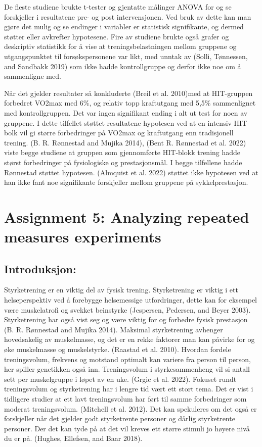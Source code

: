 \documentclass[
  letterpaper,
  DIV=11,
  numbers=noendperiod]{scrreprt}
\begin{document}
De fleste studiene brukte t-tester og gjentatte målinger ANOVA for og se
forskjeller i resultatene pre- og post intervensjonen. Ved bruk av dette
kan man gjøre det mulig og se endinger i variabler er statistisk
signifikante, og dermed støtter eller avkrefter hypotesene. Fire av
studiene brukte også grafer og deskriptiv statistikk for å vise at
treningsbelastningen mellom gruppene og utgangspunktet til
forsøkspersonene var likt, med unntak av (Solli, Tønnessen, and Sandbakk
2019) som ikke hadde kontrollgruppe og derfor ikke noe om å sammenligne
med.

Når det gjelder resultater så konkluderte (Breil et al. 2010)med at
HIT-gruppen forbedret VO2max med 6\%, og relativ topp kraftutgang med
5,5\% sammenlignet med kontrollgruppen. Det var ingen signifikant ending
i alt ut test for noen av gruppene. I dette tilfellet støttet
resultatene hypotesen ved at en intensiv HIT-bolk vil gi større
forbedringer på VO2max og kraftutgang enn tradisjonell trening. (B. R.
Rønnestad and Mujika 2014), (Bent R. Rønnestad et al. 2022) viste begge
studiene at gruppen som gjennomførte HIT-blokk trening hadde størst
forbedringer på fysiologiske og prestasjonsmål. I begge tilfellene hadde
Rønnestad støttet hypotesen. (Almquist et al. 2022) støttet ikke
hypotesen ved at han ikke fant noe signifikante forskjeller mellom
gruppene på sykkelprestasjon.


\chapter{Assignment 5: Analyzing repeated measures
experiments}\label{assignment-5-analyzing-repeated-measures-experiments}

\section{Introduksjon:}\label{introduksjon-2}

Styrketrening er en viktig del av fysisk trening. Styrketrening er
viktig i ett helseperspektiv ved å forebygge helsemessige utfordringer,
dette kan for eksempel være muskelatrofi og svekket beinstyrke
(Jespersen, Pedersen, and Beyer 2003). Styrketrening har også vist seg
og være viktig for og forbedre fysisk prestasjon (B. R. Rønnestad and
Mujika 2014). Maksimal styrketrening avhenger hovedsakelig av
muskelmasse, og det er en rekke faktorer man kan påvirke for og øke
muskelmasse og muskelstyrke. (Raastad et al. 2010). Hvordan fordele
treningsvolum, frekvens og motstand optimalt kan variere fra person til
person, her spiller genetikken også inn. Treningsvolum i
styrkesammenheng vil si antall sett per muskelgruppe i løpet av en uke.
(Grgic et al. 2022). Fokuset rundt treningsvolum og styrketrening har i
lengre tid vært ett stort tema. Det er vist i tidligere studier at ett
lavt treningsvolum har ført til samme forbedringer som moderat
treningsvolum. (Mitchell et al. 2012). Det kan spekuleres om det også er
forskjeller når det gjelder godt styrketrente personer og dårlig
styrketrente personer. Der det kan tyde på at det vil kreves ett større
stimuli jo høyere nivå du er på. (Hughes, Ellefsen, and Baar 2018).
\end{document}
